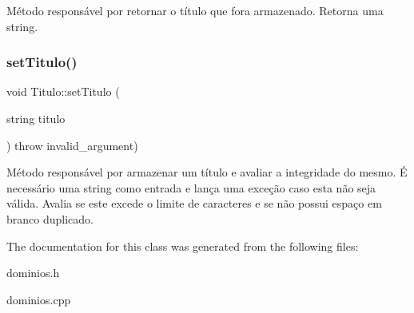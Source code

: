Método responsável por retornar o título que fora armazenado. Retorna uma string. \mbox{\label{classTitulo_ac4b3e70d24f498a9085ae9d01d51ef12}} 
\subsubsection{\texorpdfstring{set\+Titulo()}{setTitulo()}}
{\footnotesize\ttfamily void Titulo\+::set\+Titulo (\begin{DoxyParamCaption}\item[{string}]{titulo }\end{DoxyParamCaption}) throw  invalid\+\_\+argument) }

Método responsável por armazenar um título e avaliar a integridade do mesmo. É necessário uma string como entrada e lança uma exceção caso esta não seja válida. Avalia se este excede o limite de caracteres e se não possui espaço em branco duplicado. 

The documentation for this class was generated from the following files\+:\begin{DoxyCompactItemize}
\item 
dominios.\+h\item 
dominios.\+cpp\end{DoxyCompactItemize}
